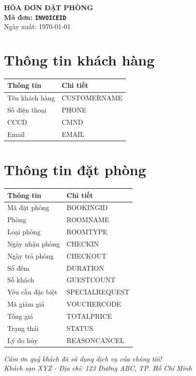 \documentclass[a4paper,12pt]{article}
\begin{document}
\begin{center}
    \textbf{\LARGE HÓA ĐƠN ĐẶT PHÒNG} \\
    \vspace{0.5cm}
    \textbf{Mã đơn: \texttt{INVOICEID}} \\
    \vspace{0.2cm}
    Ngày xuất: \vietdate\today
\end{center}

\section*{Thông tin khách hàng}
\begin{tabular}{|>{\raggedright\arraybackslash}p{5cm}|p{10cm}|}
    \hline
    \rowcolor{lightgray}
    \textbf{Thông tin} & \textbf{Chi tiết} \\ \hline
    Tên khách hàng & CUSTOMERNAME \\ \hline
    Số điện thoại & PHONE \\ \hline
    CCCD & CMND \\ \hline
    Email & EMAIL \\ \hline
\end{tabular}

\section*{Thông tin đặt phòng}
\begin{tabular}{|>{\raggedright\arraybackslash}p{5cm}|p{10cm}|}
    \hline
    \rowcolor{lightgray}
    \textbf{Thông tin} & \textbf{Chi tiết} \\ \hline
    Mã đặt phòng & BOOKINGID \\ \hline
    Phòng & ROOMNAME \\ \hline
    Loại phòng & ROOMTYPE \\ \hline
    Ngày nhận phòng & CHECKIN \\ \hline
    Ngày trả phòng & CHECKOUT \\ \hline
    Số đêm & DURATION \\ \hline
    Số khách & GUESTCOUNT \\ \hline
    Yêu cầu đặc biệt & SPECIALREQUEST \\ \hline
    Mã giảm giá & VOUCHERCODE \\ \hline
    Tổng giá & TOTALPRICE \\ \hline
    Trạng thái & STATUS \\ \hline
    Lý do hủy & REASONCANCEL \\ \hline
\end{tabular}

\vspace{1cm}
\begin{center}
    \textit{Cảm ơn quý khách đã sử dụng dịch vụ của chúng tôi!} \\
    \textit{Khách sạn XYZ - Địa chỉ: 123 Đường ABC, TP. Hồ Chí Minh}
\end{center}
\end{document}
